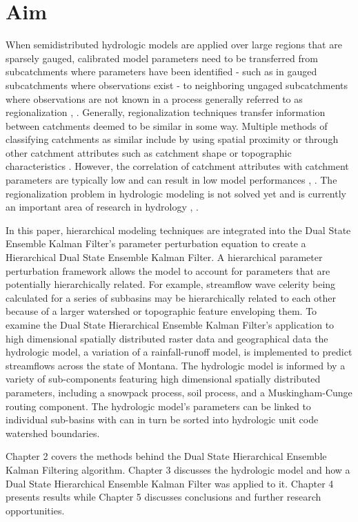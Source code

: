 \section{Aim}	
	When semidistributed hydrologic models are applied over large regions that are sparsely gauged, calibrated model parameters need to be transferred from subcatchments where parameters have been identified - such as in gauged subcatchments where observations exist - to neighboring ungaged subcatchments where observations are not known in a process generally referred to as regionalization \cite{Bloschl1995}, \cite{Merz2004}. Generally, regionalization techniques transfer information between catchments deemed to be similar in some way. Multiple methods of classifying catchments as similar include by using spatial proximity \cite{Julier1997} or through other catchment attributes such as catchment shape or topographic characteristics \cite{Peel2000}. However, the correlation of catchment attributes with catchment parameters are typically low \cite{Bardossy2007} and can result in low model performances \cite{Seibert1999}, \cite{Beldring2003}. The regionalization problem in hydrologic modeling is not solved yet and is currently an important area of research in hydrology  \cite{Bardossy2007}, \cite{Gotzinger2007}.
 
	In this paper, hierarchical modeling techniques are integrated into the Dual State Ensemble Kalman Filter's parameter perturbation equation to create a Hierarchical Dual State Ensemble Kalman Filter. A hierarchical parameter perturbation framework allows the model to account for parameters that are potentially hierarchically related. For example, streamflow wave celerity being calculated for a series of subbasins may be hierarchically related to each other because of a larger watershed or topographic feature enveloping them. To examine the Dual State Hierarchical Ensemble Kalman Filter's application to high dimensional spatially distributed raster data and geographical data the hydrologic model, a variation of a rainfall-runoff model, is implemented to predict streamflows across the state of Montana. The hydrologic model is informed by a variety of sub-components featuring high dimensional spatially distributed parameters, including a snowpack process, soil process, and a Muskingham-Cunge routing component. The hydrologic model's parameters can be linked to individual sub-basins with can in turn be sorted into hydrologic unit code watershed boundaries.
	
	Chapter 2 covers the methods behind the Dual State Hierarchical Ensemble Kalman Filtering algorithm. Chapter 3 discusses the hydrologic model and how a Dual State Hierarchical Ensemble Kalman Filter was applied to it. Chapter 4 presents results while Chapter 5 discusses conclusions and further research opportunities.
	
	